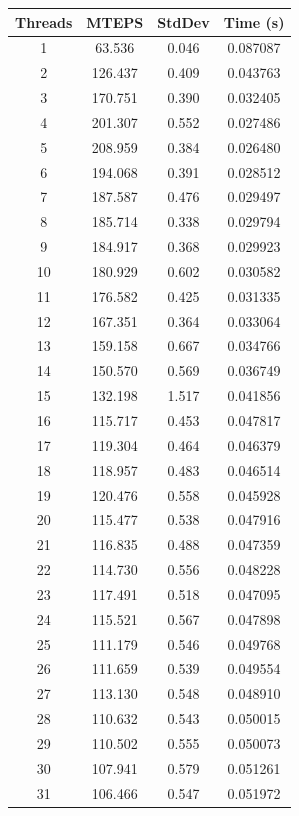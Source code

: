 \documentclass[10pt,twocolumn,letterpaper]{article}
\begin{document}
\begin{table}[h]
\renewcommand\arraystretch{0.8}
\centering
\begin{tabular}{@{}c|ccc@{}}
\toprule
Threads          & MTEPS  & StdDev     & Time (s)      \\ \midrule
1 & 63.536 & 0.046 & 0.087087 \\
2 & 126.437 & 0.409 & 0.043763 \\
3 & 170.751 & 0.390 & 0.032405 \\
4 & 201.307 & 0.552 & 0.027486 \\
5 & 208.959 & 0.384 & 0.026480 \\
6 & 194.068 & 0.391 & 0.028512 \\
7 & 187.587 & 0.476 & 0.029497 \\
8 & 185.714 & 0.338 & 0.029794 \\
9 & 184.917 & 0.368 & 0.029923 \\
10 & 180.929 & 0.602 & 0.030582 \\
11 & 176.582 & 0.425 & 0.031335 \\
12 & 167.351 & 0.364 & 0.033064 \\
13 & 159.158 & 0.667 & 0.034766 \\
14 & 150.570 & 0.569 & 0.036749 \\
15 & 132.198 & 1.517 & 0.041856 \\
16 & 115.717 & 0.453 & 0.047817 \\
17 & 119.304 & 0.464 & 0.046379 \\
18 & 118.957 & 0.483 & 0.046514 \\
19 & 120.476 & 0.558 & 0.045928 \\
20 & 115.477 & 0.538 & 0.047916 \\
21 & 116.835 & 0.488 & 0.047359 \\
22 & 114.730 & 0.556 & 0.048228 \\
23 & 117.491 & 0.518 & 0.047095 \\
24 & 115.521 & 0.567 & 0.047898 \\
25 & 111.179 & 0.546 & 0.049768 \\
26 & 111.659 & 0.539 & 0.049554 \\
27 & 113.130 & 0.548 & 0.048910 \\
28 & 110.632 & 0.543 & 0.050015 \\
29 & 110.502 & 0.555 & 0.050073 \\
30 & 107.941 & 0.579 & 0.051261 \\
31 & 106.466 & 0.547 & 0.051972 \\

\end{tabular}
\end{table}
\end{document}
